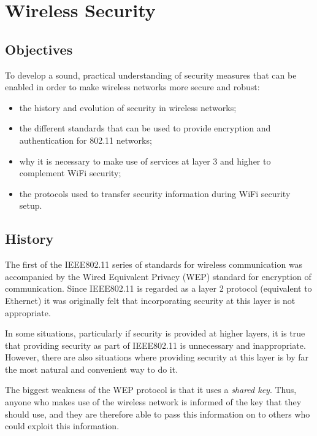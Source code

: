 \chapter{Wireless Security}\label{security}

\minitoc 

\clearpage
\section*{Objectives}
To develop a sound, practical understanding of security measures that can be enabled in order to make wireless networks more secure and robust:
\begin{itemize}

\item the history and evolution of security in wireless networks;

\item the different standards that can be used to provide encryption and authentication for 802.11 networks;

\item why it is necessary to make use of services at layer 3 and higher to complement WiFi security;

\item the protocols used to transfer security information during WiFi security setup.

\end{itemize}


\section{History}
The first of the IEEE802.11 series of standards for wireless
communication was accompanied by the Wired Equivalent Privacy (WEP)
standard for encryption of communication. Since IEEE802.11 is regarded
as a layer 2 protocol (equivalent to Ethernet) it was originally felt
that incorporating security at this layer is not appropriate.

In some situations, particularly if security is provided at higher layers,
it is true that providing security as part of IEEE802.11 is unnecessary
and inappropriate. However, there are also situations where providing
security at this layer is by far the most natural and convenient way to
do it.

The biggest weakness of the WEP protocol is that it uses a {\em shared
key}. Thus, anyone who makes use of the wireless network is informed of
the key that they should use, and they are therefore able to pass this
information on to others who could exploit this information.


